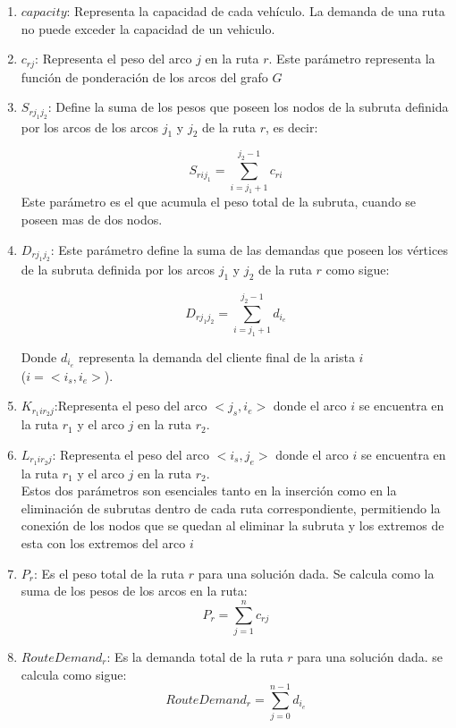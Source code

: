 \documentclass{article}
\begin{document}
\begin{enumerate}
\item{$capacity$: Representa la capacidad de cada vehículo. La demanda de una ruta no puede exceder la capacidad de un vehiculo.}
\item{$c_{rj}$: Representa el peso del arco $j$ en la ruta $r$. Este parámetro representa la función de ponderación de los arcos del grafo $G$}

\item{$S_{rj_1j_2}$: Define la suma de los pesos que poseen los nodos de la subruta definida por los arcos de los arcos $j_1$ y $j_2$ de la ruta $r$, es decir:}

\[
S_{rij_1}=\sum\limits_{i=j_1+1}^{j_2-1} c_{ri} 
\]
Este parámetro es el que acumula el peso total de la subruta, cuando se poseen mas de dos nodos.

\item {$D_{rj_1j_2}$: Este parámetro define la suma de las demandas que poseen los vértices de la subruta definida por los arcos $j_1$ y $j_2$ de la ruta $r$ como sigue:}

\[
D_{rj_1j_2}=\sum\limits_{i=j_1+1}^{j_2-1} d_{i_e} 
\]

Donde $d_{i_e}$ representa la demanda del cliente final de la arista $i$ \\($i = <i_s,i_e>$).

\item{$K_{r_1ir_2j}$:Representa el peso del arco $<j_s,i_e>$ donde el arco $i$ se encuentra en la ruta $r_1$ y el arco $j$ en la ruta $r_2$}.
\item{$L_{r_1ir_2j}$: Representa el peso del arco $<i_s,j_e>$ donde el arco $i$ se encuentra en la ruta $r_1$ y el arco  $j$ en la ruta $r_2$}.\\
Estos dos parámetros son esenciales tanto en la inserción como en la eliminación de subrutas dentro de cada ruta correspondiente, permitiendo la conexión de los nodos que se quedan al eliminar la subruta y los extremos de esta con los extremos del arco $i$

\item{$P_r$: Es el peso total de la ruta $r$ para una solución dada. Se calcula como la suma de los pesos de los arcos en la ruta:}
  \[
P_r=\sum\limits_{j=1}^{n} c_{rj}  
\]

\item{$RouteDemand_r$: Es la demanda total de la ruta $r$ para una solución dada. se calcula como sigue:}
\[
RouteDemand_r = \sum\limits_{j=0}^{n-1} d_{i_e}
\] 


\end{enumerate}
\end{document}
